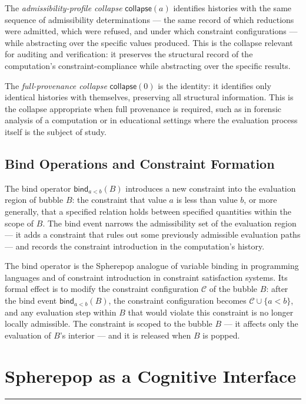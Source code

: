 \documentclass[12pt,openany]{book}
\theoremstyle{plain}
\theoremstyle{definition}
\theoremstyle{remark}
\newcommand{\scollapse}[1]{\mathsf{collapse}\!\left(#1\right)}
\newcommand{\sbind}[2]{\mathsf{bind}_{#1}\!\left(#2\right)}
\newcommand{\chapterrule}{%
  \vspace{4pt}%
  {\color{SpherepopBlue}\rule{\textwidth}{0.8pt}}%
  \vspace{10pt}%
}
\begin{document}
The \emph{admissibility-profile collapse} $\scollapse{a}$ identifies histories with the same sequence of admissibility determinations — the same record of which reductions were admitted, which were refused, and under which constraint configurations — while abstracting over the specific values produced. This is the collapse relevant for auditing and verification: it preserves the structural record of the computation's constraint-compliance while abstracting over the specific results.

The \emph{full-provenance collapse} $\scollapse{0}$ is the identity: it identifies only identical histories with themselves, preserving all structural information. This is the collapse appropriate when full provenance is required, such as in forensic analysis of a computation or in educational settings where the evaluation process itself is the subject of study.

\section{Bind Operations and Constraint Formation}

The bind operator $\sbind{a<b}{B}$ introduces a new constraint into the evaluation region of bubble $B$: the constraint that value $a$ is less than value $b$, or more generally, that a specified relation holds between specified quantities within the scope of $B$. The bind event narrows the admissibility set of the evaluation region — it adds a constraint that rules out some previously admissible evaluation paths — and records the constraint introduction in the computation's history.

The bind operator is the Spherepop analogue of variable binding in programming languages and of constraint introduction in constraint satisfaction systems. Its formal effect is to modify the constraint configuration $\mathcal{C}$ of the bubble $B$: after the bind event $\sbind{a<b}{B}$, the constraint configuration becomes $\mathcal{C} \cup \{a < b\}$, and any evaluation step within $B$ that would violate this constraint is no longer locally admissible. The constraint is scoped to the bubble $B$ — it affects only the evaluation of $B$'s interior — and it is released when $B$ is popped.

\chapter{Spherepop as a Cognitive Interface}
\chapterrule
\end{document}
